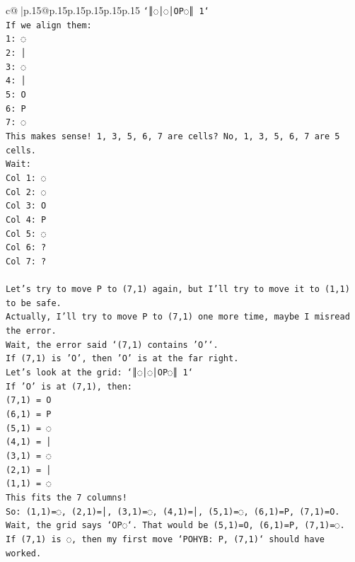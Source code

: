 \documentclass{article}
\begin{document}
{\begin{supertabular}{c@{$\;$}|p{.15\linewidth}@{}p{.15\linewidth}p{.15\linewidth}p{.15\linewidth}p{.15\linewidth}p{.15\linewidth}}
{{{\texttt{`║◌│◌│OP◌║ 1`} \\
\texttt{If we align them:} \\
\texttt{1: ◌} \\
\texttt{2: │} \\
\texttt{3: ◌} \\
\texttt{4: │} \\
\texttt{5: O} \\
\texttt{6: P} \\
\texttt{7: ◌} \\
\texttt{This makes sense! 1, 3, 5, 6, 7 are cells? No, 1, 3, 5, 6, 7 are 5 cells.} \\
\texttt{Wait:} \\
\texttt{Col 1: ◌} \\
\texttt{Col 2: ◌} \\
\texttt{Col 3: O} \\
\texttt{Col 4: P} \\
\texttt{Col 5: ◌} \\
\texttt{Col 6: ?} \\
\texttt{Col 7: ?} \\
\\ 
\texttt{Let's try to move P to (7,1) again, but I'll try to move it to (1,1) to be safe.} \\
\texttt{Actually, I'll try to move P to (7,1) one more time, maybe I misread the error.} \\
\texttt{Wait, the error said `(7,1) contains 'O'`.} \\
\texttt{If (7,1) is 'O', then 'O' is at the far right.} \\
\texttt{Let's look at the grid: `║◌│◌│OP◌║ 1`} \\
\texttt{If 'O' is at (7,1), then:} \\
\texttt{(7,1) = O} \\
\texttt{(6,1) = P} \\
\texttt{(5,1) = ◌} \\
\texttt{(4,1) = │} \\
\texttt{(3,1) = ◌} \\
\texttt{(2,1) = │} \\
\texttt{(1,1) = ◌} \\
\texttt{This fits the 7 columns!} \\
\texttt{So: (1,1)=◌, (2,1)=│, (3,1)=◌, (4,1)=│, (5,1)=◌, (6,1)=P, (7,1)=O.} \\
\texttt{Wait, the grid says `OP◌`. That would be (5,1)=O, (6,1)=P, (7,1)=◌.} \\
\texttt{If (7,1) is ◌, then my first move `POHYB: P, (7,1)` should have worked.} \\
}}}
\end{supertabular}}
\end{document}
